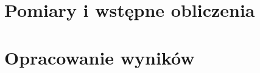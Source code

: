\documentclass[a4paper]{article}
\begin{document}
%

\section{Pomiary i wstępne obliczenia}
\section{Opracowanie wyników}
\end{document}
